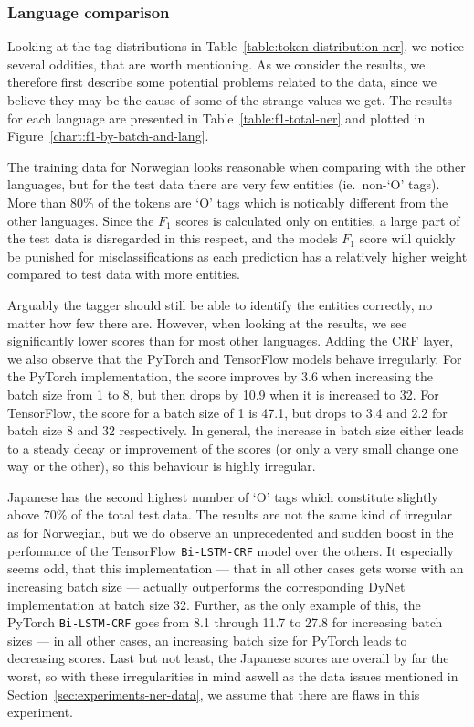 \subsubsection{Language comparison}\label{sec:experiments-ner-lang-comparison}

Looking at the tag distributions in Table~\ref{table:token-distribution-ner}, we
notice several oddities, that are worth mentioning. As we consider the results,
we therefore first describe some potential problems related to the data, since
we believe they may be the cause of some of the strange values we get. The
results for each language are presented in Table~\ref{table:f1-total-ner} and
plotted in Figure~\ref{chart:f1-by-batch-and-lang}.

The training data for Norwegian looks reasonable when comparing with the other
languages, but for the test data there are very few entities (ie.\ non-`O'
tags). More than 80\% of the tokens are `O' tags which is noticably different
from the other languages. Since the $F_{1}$ scores is calculated only on
entities, a large part of the test data is disregarded in this respect, and the
models $F_{1}$ score will quickly be punished for misclassifications as each
prediction has a relatively higher weight compared to test data with more
entities.

Arguably the tagger should still be able to identify the entities correctly, no
matter how few there are. However, when looking at the results, we see
significantly lower scores than for most other languages. Adding the CRF layer,
we also observe that the PyTorch and TensorFlow models behave irregularly. For
the PyTorch implementation, the score improves by 3.6 when increasing the
batch size from 1 to 8, but then drops by 10.9 when it is increased to 32. For
TensorFlow, the score for a batch size of 1 is 47.1, but drops to 3.4 and 2.2
for batch size 8 and 32 respectively. In general, the increase in batch size
either leads to a steady decay or improvement of the scores (or only a very
small change one way or the other), so this behaviour is highly irregular.

Japanese has the second highest number of `O' tags which constitute slightly
above 70\% of the total test data. The results are not the same kind of
irregular as for Norwegian, but we do observe an unprecedented and sudden boost
in the perfomance of the TensorFlow \texttt{Bi-LSTM-CRF} model over the others.
It especially seems odd, that this implementation --- that in all other cases
gets worse with an increasing batch size --- actually outperforms the
corresponding DyNet implementation at batch size 32. Further, as the only example
of this, the PyTorch \texttt{Bi-LSTM-CRF} goes from 8.1 through 11.7 to 27.8 for
increasing batch sizes --- in all other cases, an increasing batch size for
PyTorch leads to decreasing scores. Last but not least, the Japanese scores are
overall by far the worst, so with these irregularities in mind aswell as the
data issues mentioned in Section~\ref{sec:experiments-ner-data}, we assume that
there are flaws in this experiment.

